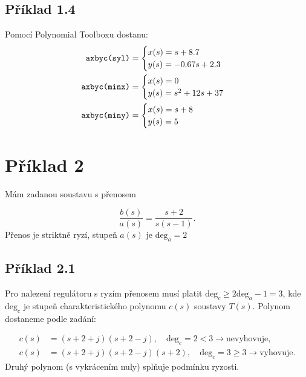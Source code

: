 \documentclass[12pt]{article}
\begin{document}
\subsection{Příklad 1.4}
Pomocí Polynomial Toolboxu dostanu:
\begin{equation}
  \begin{aligned}
    \text{\texttt{axbyc(syl)}} &=
    \begin{cases}
      x(s) = s + 8.7 \\
      y(s) = -0.67s + 2.3
    \end{cases} \\
    \text{\texttt{axbyc(minx)}} &=
    \begin{cases}
      x(s) = 0 \\
      y(s) = s^2 + 12s + 37
    \end{cases} \\
    \text{\texttt{axbyc(miny)}} &=
    \begin{cases}
      x(s) = s + 8 \\
      y(s) = 5
    \end{cases}
  \end{aligned}
\end{equation}


\section{Příklad 2}
Mám zadanou soustavu s přenosem

\begin{equation}
  \frac{b(s)}{a(s)} = \frac{s+2}{s(s-1)}.
\end{equation}
Přenos je striktně ryzí, stupeň $a(s)$ je $\text{deg}_a = 2$

\subsection{Příklad 2.1}
Pro nalezení regulátoru s ryzím přenosem musí platit $\text{deg}_c \geq
2\text{deg}_a - 1 = 3$, kde $\text{deg}_c$ je stupeň charakteristického polynomu
$c(s)$ soustavy $T(s)$. Polynom dostaneme podle zadání:

\begin{equation}
  \begin{aligned}
    c(s) &= (s+2+j)(s+2-j), \quad \text{deg}_c = 2 < 3 \rightarrow \text{nevyhovuje}, \\
    c(s) &= (s+2+j)(s+2-j)(s+2), \quad \text{deg}_c = 3 \geq 3 \rightarrow \text{vyhovuje}.
  \end{aligned}
\end{equation}
Druhý polynom (s vykrácením nuly) splňuje podmínku ryzosti.
\end{document}
